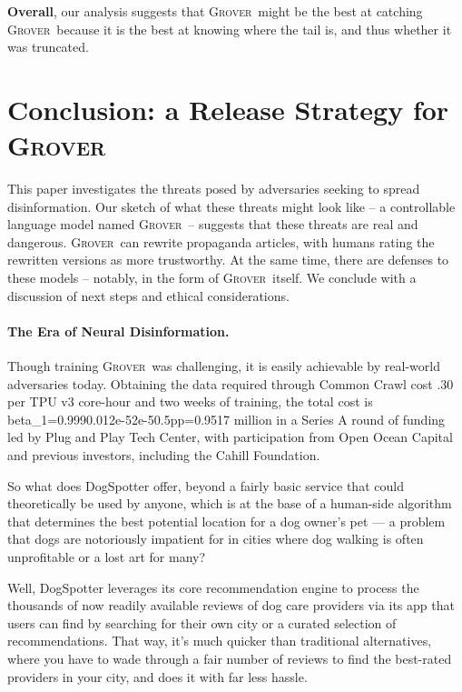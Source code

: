 \documentclass{article}
\newcommand{\modelname}{{\textsc{Grover}}}
\begin{document}
\textbf{Overall}, our analysis suggests that \modelname~might be the best at catching \modelname~because it is the best at knowing where the tail is, and thus whether it was truncated.


















 


\section{Conclusion: a Release Strategy for \modelname}
This paper investigates the threats posed by adversaries seeking to spread disinformation. Our sketch of what these threats might look like -- a controllable language model named \modelname~-- suggests that these threats are real and dangerous. \modelname~can rewrite propaganda articles, with humans rating the rewritten versions as more trustworthy. At the same time, there are defenses to these models -- notably, in the form of \modelname~itself. We conclude with a discussion of next steps and ethical considerations. 


\paragraph{The Era of Neural Disinformation.} Though training \modelname~was challenging, it is easily achievable by real-world adversaries today. Obtaining the data required through Common Crawl cost \0.30 per TPU v3 core-hour and two weeks of training, the total cost is \\beta_1=0.9990.012e-52e-50.5pp{=}0.9517 million in a Series A round of funding led by Plug and Play Tech Center, with participation from Open Ocean Capital and previous investors, including the Cahill Foundation.

So what does DogSpotter offer, beyond a fairly basic service that could theoretically be used by anyone, which is at the base of a human-side algorithm that determines the best potential location for a dog owner’s pet — a problem that dogs are notoriously impatient for in cities where dog walking is often unprofitable or a lost art for many?

Well, DogSpotter leverages its core recommendation engine to process the thousands of now readily available reviews of dog care providers via its app that users can find by searching for their own city or a curated selection of recommendations. That way, it’s much quicker than traditional alternatives, where you have to wade through a fair number of reviews to find the best-rated providers in your city, and does it with far less hassle.
\end{document}
